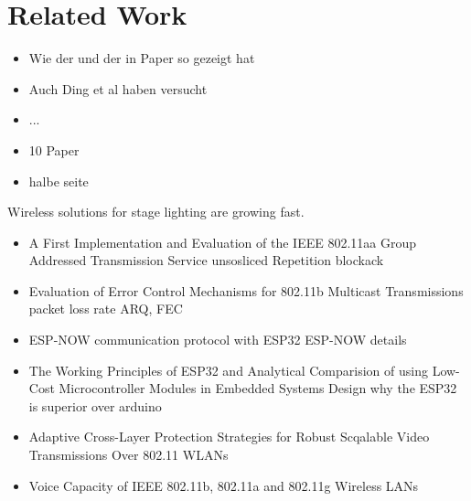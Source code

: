 
\chapter{Related Work}
\begin{itemize}
	\item Wie der und der in Paper so gezeigt hat 
	\item Auch Ding et al haben versucht
	\item ...
	\item 10 Paper
	\item halbe seite
\end{itemize}









Wireless solutions for stage lighting are growing fast. 

\begin{itemize}
	\item A First Implementation and Evaluation of the IEEE 802.11aa Group Addressed Transmission Service    
		\subitem unsosliced Repetition
		\subitem blockack
	\item Evaluation of Error Control Mechanisms for 802.11b Multicast Transmissions
		\subitem packet loss rate
		\subitem ARQ, FEC
	\item ESP-NOW communication protocol with ESP32
		\subitem ESP-NOW details
	\item The Working Principles of ESP32 and Analytical Comparision of using Low-Cost Microcontroller Modules in Embedded Systems Design
		\subitem why the ESP32 is superior over arduino
	\item Adaptive Cross-Layer Protection Strategies for Robust Scqalable Video Transmissions Over 802.11 WLANs
	\item Voice Capacity of IEEE 802.11b, 802.11a and 802.11g Wireless LANs
\end{itemize}




